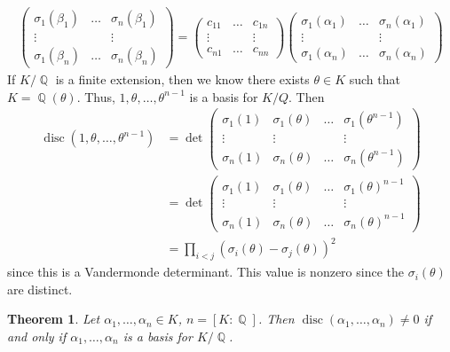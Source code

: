 \documentclass[11pt, a4paper]{memoir}
\DeclareMathOperator{\Q}{{\mathbb{Q}}}
\theoremstyle{change}
\newtheorem{theorem}{Theorem}[section]
\theoremstyle{plain}
\theoremstyle{nonumberplain}
\DeclareMathOperator{\disc}{disc}
\begin{document}
\begin{align*}
    \begin{pmatrix}
        \sigma_1(\beta_1) &\hdots&\sigma_n(\beta_1)\\
        \vdots&&\vdots\\
        \sigma_1(\beta_n)&\hdots&\sigma_n(\beta_n)
    \end{pmatrix}
    =
    \begin{pmatrix}
        c_{11} &\hdots&c_{1n}\\
        \vdots&&\vdots\\
        c_{n1}&\hdots&c_{nn}
    \end{pmatrix}
    \begin{pmatrix}
        \sigma_1(\alpha_1) &\hdots&\sigma_n(\alpha_1)\\
        \vdots&&\vdots\\
        \sigma_1(\alpha_n)&\hdots&\sigma_n(\alpha_n)
    \end{pmatrix}
\end{align*}
If $K/\Q$ is a finite extension, then we know there exists $\theta\in K$ such that $K=\Q(\theta)$.
Thus, $1,\theta,\ldots,\theta^{n-1}$ is a basis for $K/Q$.
Then
\begin{align*}
    \disc(1,\theta,\ldots,\theta^{n-1}) &= \det\begin{pmatrix}\sigma_1(1) &\sigma_1(\theta)&\hdots&\sigma_1(\theta^{n-1})\\\vdots&\vdots&&\vdots\\\sigma_n(1)&\sigma_n(\theta)&\hdots&\sigma_n(\theta^{n-1})\end{pmatrix}\\
                                        &=\det\begin{pmatrix}\sigma_1(1) &\sigma_1(\theta)&\hdots&\sigma_1(\theta)^{n-1}\\\vdots&\vdots&&\vdots\\\sigma_n(1)&\sigma_n(\theta)&\hdots&\sigma_n(\theta)^{n-1}\end{pmatrix}\\
                                        &= \prod_{i<j}(\sigma_i(\theta)-\sigma_j(\theta))^2
\end{align*}
since this is a Vandermonde determinant.
This value is nonzero since the $\sigma_i(\theta)$ are distinct.
\begin{theorem}
    Let $\alpha_1,\ldots,\alpha_n\in K$, $n=[K:\Q]$.
    Then $\disc(\alpha_1,\ldots,\alpha_n)\neq 0$ if and only if $\alpha_1,\ldots,\alpha_n$ is a basis for $K/\Q$.
\end{theorem}
\end{document}

